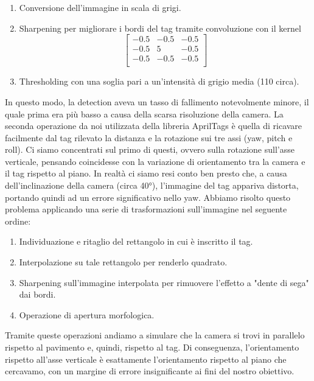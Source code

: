 \documentclass[]{article}
\begin{document}
\begin{enumerate}
    \item Conversione dell'immagine in scala di grigi.
    \item Sharpening per migliorare i bordi del tag tramite convoluzione con il kernel $$\begin{bmatrix}
                  -0.5 & -0.5 & -0.5 \\
                  -0.5 & 5    & -0.5 \\
                  -0.5 & -0.5 & -0.5 \\
              \end{bmatrix}$$
    \item Thresholding con una soglia pari a un'intensità di grigio media (110 circa).
\end{enumerate}
In questo modo, la detection aveva un tasso di fallimento notevolmente minore, il quale prima era più basso a causa della scarsa risoluzione della camera. La seconda operazione da noi utilizzata della libreria AprilTags è quella di ricavare facilmente dal tag rilevato la distanza e la rotazione sui tre assi (yaw, pitch e roll). Ci siamo concentrati sul primo di questi, ovvero sulla rotazione sull'asse verticale, pensando 
coincidesse con la variazione di orientamento tra la camera e il tag rispetto al piano. In realtà ci siamo resi conto ben presto che, a causa dell'inclinazione della camera (circa 40°), l'immagine del tag appariva distorta, portando quindi ad un errore significativo nello yaw. Abbiamo risolto questo problema applicando una serie di trasformazioni sull'immagine nel seguente ordine:
\begin{enumerate}
    \item Individuazione e ritaglio del rettangolo in cui è inscritto il tag.
    \item Interpolazione su tale rettangolo per renderlo quadrato.
    \item Sharpening sull'immagine interpolata per rimuovere l'effetto a "dente di sega" dai bordi.
    \item Operazione di apertura morfologica.
\end{enumerate}
Tramite queste operazioni andiamo a simulare che la camera si trovi in parallelo rispetto al pavimento e, quindi, rispetto al tag. Di conseguenza, l'orientamento rispetto all'asse verticale è esattamente l'orientamento rispetto al piano che cercavamo, con un margine di errore insignificante ai fini del nostro obiettivo.
\end{document}
